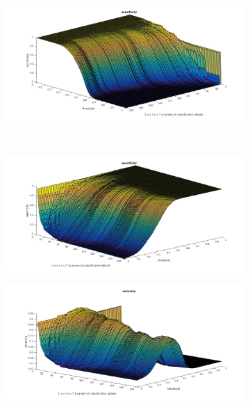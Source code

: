             \begin{figure}
                \centering
                \begin{subfigure}[b]{0.9\textwidth}
                    \includegraphics[width=\textwidth]{img/sensitivity_tuning.jpg}
                    \caption{}
                    \label{fig:sensitivity_tuning}
                \end{subfigure}
                ~ %
                \begin{subfigure}[b]{0.9\textwidth}
                    \includegraphics[width=\textwidth]{img/specificity_tuning.jpg}
                    \caption{}
                    \label{fig:specificity_tuning}
                \end{subfigure}
                \begin{subfigure}[b]{0.9\textwidth}
                    \includegraphics[width=\textwidth]{img/accuracy_tuning.jpg}

\end{subfigure}
\end{figure}
